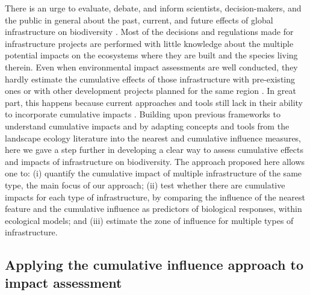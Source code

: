 \documentclass[titlepage]{article}
\begin{document}
There is an urge to evaluate, debate, and inform scientists, decision-makers, and the public in general about the past, current, and future effects of global infrastructure on biodiversity \citep{laurance_conservation_2018}. Most of the decisions and regulations made for infrastructure projects are performed with little knowledge about the multiple potential impacts on the ecosystems where they are built and the species living therein. Even when environmental impact assessments are well conducted, they hardly estimate the cumulative effects of those infrastructure with pre-existing ones or with other development projects planned for the same region \citep{laurance_roads_2017, krausman_cumulative_2011}. In great part, this happens because current approaches and tools still lack in their ability to incorporate cumulative impacts \citep[but see][for recent advances]{gillingham_integration_2016}. Building upon previous frameworks to understand cumulative impacts \citep{naugle_unifying_2011} and by adapting concepts and tools from the landscape ecology literature into the nearest and cumulative influence measures, here we gave a step further in developing a clear way to assess cumulative effects and impacts of infrastructure on biodiversity. The approach proposed here allows one to: (i) quantify the cumulative impact of multiple infrastructure of the same type, the main focus of our approach; (ii) test whether there are cumulative impacts for each type of infrastructure, by comparing the influence of the nearest feature and the cumulative influence as predictors of biological responses, within ecological models; and (iii) estimate the zone 
of influence for multiple types of infrastructure. 

\subsection{Applying the cumulative influence approach to impact assessment}
\end{document}
